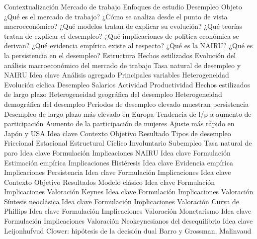 \documentclass{nuevotema}
\begin{document}
\begin{esquema}[enumerate]
	\1[] 
		\2 Contextualización
			\3 Mercado de trabajo
			\3 Enfoques de estudio
			\3 Desempleo
		\2 Objeto
			\3 ¿Qué es el mercado de trabajo?
			\3 ¿Cómo se analiza desde el punto de vista macroeconómico?
			\3 ¿Qué modelos tratan de explicar su evolución?
			\3 ¿Qué teorías tratan de explicar el desempleo?
			\3 ¿Qué implicaciones de política económica se derivan?
			\3 ¿Qué evidencia empírica existe al respecto?
			\3 ¿Qué es la NAIRU?
			\3 ¿Qué es la persistencia en el desempleo?
		\2 Estructura
			\3 Hechos estilizados
			\3 Evolución del análisis macroeconómico del mercado de trabajo
			\3 Tasa natural de desempleo y NAIRU
	\1 
		\2 Idea clave
			\3 Análisis agregado
			\3 Principales variables
			\3 Heterogeneidad
		\2 Evolución cíclica
			\3 Desempleo
			\3 Salarios
			\3 Actividad
			\3 Productividad
		\2 Hechos estilizados de largo plazo
			\3 Heterogeneidad geográfica del desempleo
			\3 Heterogeneidad demográfica del desempleo
			\3 Periodos de desempleo elevado muestran persistencia
			\3 Desempleo de largo plazo más elevado en Europa
			\3 Tendencia de l/p a aumento de participación
			\3 Aumento de la participación de mujeres
			\3 Ajuste más rápido en Japón y USA
	\1 
		\2 Idea clave
			\3 Contexto
			\3 Objetivo
			\3 Resultado
		\2 Tipos de desempleo
			\3 Friccional
			\3 Estacional
			\3 Estructural
			\3 Cíclico
			\3 Involuntario
			\3 Subempleo
		\2 Tasa natural de paro
			\3 Idea clave
			\3 Formulación
			\3 Implicaciones
		\2 NAIRU
			\3 Idea clave
			\3 Formulación
			\3 Estimación empírica
			\3 Implicaciones
		\2 Histéresis
			\3 Idea clave
			\3 Evidencia empírica
			\3 Implicaciones
		\2 Persistencia
			\3 Idea clave
			\3 Formulación
			\3 Implicaciones
	\1 
		\2 Idea clave
			\3 Contexto
			\3 Objetivo
			\3 Resultados
		\2 Modelo clásico
			\3 Idea clave
			\3 Formulación
			\3 Implicaciones
			\3 Valoración
		\2 Keynes
			\3 Idea clave
			\3 Formulación
			\3 Implicaciones
			\3 Valoración
		\2 Síntesis neoclásica
			\3 Idea clave
			\3 Formulación
			\3 Implicaciones
			\3 Valoración
		\2 Curva de Phillips
			\3 Idea clave
			\3 Formulación
			\3 Implicaciones
			\3 Valoración
		\2 Monetarismo
			\3 Idea clave
			\3 Formulación
			\3 Implicaciones
			\3 Valoración
		\2 Neokeynesianos del desequilibrio
			\3 Idea clave
			\3 Leijonhufvud
			\3 Clower: hipótesis de la decisión dual
			\3 Barro y Grossman, Malinvaud

\end{esquema}
\end{document}
